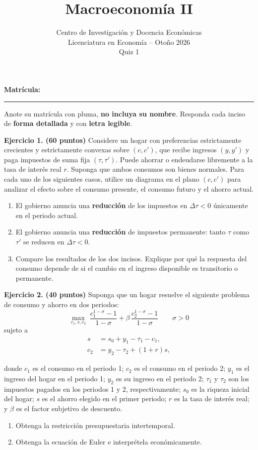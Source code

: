 \documentclass[12pt]{article}
\title{\large Macroeconomía II \vspace{0.5cm}}
\author{
  Centro de Investigación y Docencia Económicas\\
  \vspace{-0.05cm}
  Licenciatura en Economía -- Otoño 2026\\
  \vspace{-0.05cm}
  Quiz 1
}
\date{}
\numberwithin{equation}{section}
\theoremstyle{definition}
\theoremstyle{plain}
\theoremstyle{remark}
\theoremstyle{definition}
\begin{document}
\maketitle

\vspace{-.5cm}

\textbf{Matrícula:} \rule{15cm}{0.4pt}

\small
Anote su matrícula con pluma, \textbf{no incluya su nombre}.
Responda cada inciso de \textbf{forma detallada} y con
\textbf{letra legible}.

\vspace{.4cm}

\normalsize

\textbf{Ejercicio 1. (60 puntos)} Considere un hogar con preferencias estrictamente crecientes y estrictamente convexas sobre $(c,c')$, que recibe ingresos $(y,y')$ y paga impuestos de suma fija $(\tau,\tau')$. Puede ahorrar o endeudarse libremente a la tasa de interés real $r$. Suponga que ambos consumos son bienes normales.
Para cada uno de los siguientes casos, utilice un diagrama en el plano $(c,c')$ para analizar el efecto sobre el consumo presente, el consumo futuro y el ahorro actual.

\begin{enumerate}
  \item[(a)] El gobierno anuncia una \textbf{reducción} de los impuestos en $\Delta\tau<0$ únicamente en el periodo actual.

  \item[(b)] El gobierno anuncia una \textbf{reducción} de impuestos permanente: tanto $\tau$ como $\tau'$ se reducen en $\Delta\tau<0$.

  \item[(c)] Compare los resultados de los dos incisos. Explique por qué la
  respuesta del consumo depende de si el cambio en el ingreso disponible es
  transitorio o permanente.
\end{enumerate}

\textbf{Ejercicio 2. (40 puntos)} Suponga que un hogar resuelve el siguiente problema de consumo y ahorro en dos periodos:
\[
\max_{c_1,s,c_2}\;\frac{c_1^{1-\sigma}-1}{1-\sigma} + \beta \,\frac{c_2^{1-\sigma}-1}{1-\sigma} \qquad
\sigma>0
\]
sujeto a
\begin{align*}
s   &= s_0+y_1-\tau_1-c_1,\\
c_2 &= y_2-\tau_2+(1+r)s,
\end{align*}

donde $c_1$ es el consumo en el periodo 1; $c_2$ es el consumo en el periodo 2; $y_1$ es el ingreso del hogar en el periodo 1; $y_2$ es su ingreso en el periodo 2; $\tau_1$ y $\tau_2$ son los impuestos pagados en los periodos 1 y 2, respectivamente; $s_0$ es la riqueza inicial del hogar; $s$ es el ahorro elegido en el primer periodo; $r$ es la tasa de interés real; y $\beta$ es el factor subjetivo de descuento.

\begin{enumerate}
  \item[(a)] Obtenga la restricción presupuestaria intertemporal.
  \item[(b)] Obtenga la ecuación de Euler e interprétela económicamente.
\end{enumerate}
\end{document}
